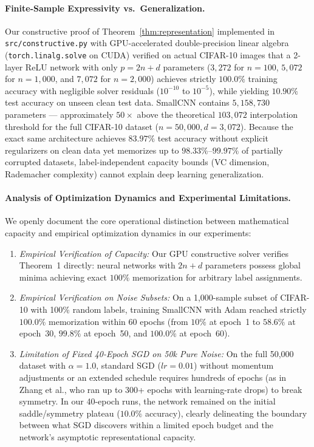 \documentclass[12pt,a4paper]{article}
\theoremstyle{definition}
\theoremstyle{remark}
\begin{document}
\paragraph{Finite-Sample Expressivity vs.\ Generalization.}
Our constructive proof of Theorem~\ref{thm:representation} implemented in \texttt{src/constructive.py} with GPU-accelerated double-precision linear algebra (\texttt{torch.linalg.solve} on CUDA) verified on actual CIFAR-10 images that a 2-layer ReLU network with only $p = 2n + d$ parameters ($3{,}272$ for $n=100$, $5{,}072$ for $n=1{,}000$, and $7{,}072$ for $n=2{,}000$) achieves strictly $100.0\%$ training accuracy with negligible solver residuals ($10^{-10}$ to $10^{-5}$), while yielding $10.90\%$ test accuracy on unseen clean test data.
SmallCNN contains $5{,}158{,}730$ parameters --- approximately $50\times$ above the theoretical $103{,}072$ interpolation threshold for the full CIFAR-10 dataset ($n=50{,}000, d=3{,}072$).
Because the exact same architecture achieves $83.97\%$ test accuracy without explicit regularizers on clean data yet memorizes up to $98.33\%$--$99.97\%$ of partially corrupted datasets, label-independent capacity bounds (VC dimension, Rademacher complexity) cannot explain deep learning generalization.

\paragraph{Analysis of Optimization Dynamics and Experimental Limitations.}
We openly document the core operational distinction between mathematical capacity and empirical optimization dynamics in our experiments:
\begin{enumerate}
  \item \emph{Empirical Verification of Capacity:} Our GPU constructive solver verifies Theorem~1 directly: neural networks with $2n+d$ parameters possess global minima achieving exact $100\%$ memorization for arbitrary label assignments.
  \item \emph{Empirical Verification on Noise Subsets:} On a 1,000-sample subset of CIFAR-10 with 100\% random labels, training SmallCNN with Adam reached strictly $100.0\%$ memorization within 60 epochs (from $10\%$ at epoch~1 to $58.6\%$ at epoch~30, $99.8\%$ at epoch~50, and $100.0\%$ at epoch~60).
  \item \emph{Limitation of Fixed 40-Epoch SGD on 50k Pure Noise:} On the full 50,000 dataset with $\alpha = 1.0$, standard SGD ($lr=0.01$) without momentum adjustments or an extended schedule requires hundreds of epochs (as in Zhang et al., who ran up to 300+ epochs with learning-rate drops) to break symmetry. In our 40-epoch runs, the network remained on the initial saddle/symmetry plateau ($10.0\%$ accuracy), clearly delineating the boundary between what SGD discovers within a limited epoch budget and the network's asymptotic representational capacity.
\end{enumerate}
\end{document}
